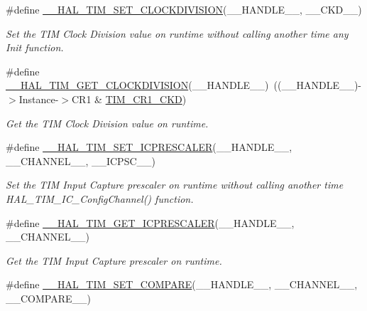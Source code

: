 \begin{DoxyCompactItemize}
\#define \mbox{\hyperlink{group___t_i_m___exported___macros_ga8aa84d77c670890408092630f9b2bdc4}{\+\_\+\+\_\+\+H\+A\+L\+\_\+\+T\+I\+M\+\_\+\+S\+E\+T\+\_\+\+C\+L\+O\+C\+K\+D\+I\+V\+I\+S\+I\+ON}}(\+\_\+\+\_\+\+H\+A\+N\+D\+L\+E\+\_\+\+\_\+,  \+\_\+\+\_\+\+C\+K\+D\+\_\+\+\_\+)
\begin{DoxyCompactList}\small\item\em Set the T\+IM Clock Division value on runtime without calling another time any Init function. \end{DoxyCompactList}\item 
\#define \mbox{\hyperlink{group___t_i_m___exported___macros_gae6bc91bb5940bce52828c690f24001b8}{\+\_\+\+\_\+\+H\+A\+L\+\_\+\+T\+I\+M\+\_\+\+G\+E\+T\+\_\+\+C\+L\+O\+C\+K\+D\+I\+V\+I\+S\+I\+ON}}(\+\_\+\+\_\+\+H\+A\+N\+D\+L\+E\+\_\+\+\_\+)~((\+\_\+\+\_\+\+H\+A\+N\+D\+L\+E\+\_\+\+\_\+)-\/$>$Instance-\/$>$C\+R1 \& \mbox{\hyperlink{group___peripheral___registers___bits___definition_gacacc4ff7e5b75fd2e4e6b672ccd33a72}{T\+I\+M\+\_\+\+C\+R1\+\_\+\+C\+KD}})
\begin{DoxyCompactList}\small\item\em Get the T\+IM Clock Division value on runtime. \end{DoxyCompactList}\item 
\#define \mbox{\hyperlink{group___t_i_m___exported___macros_gaeb106399b95ef02cec502f58276a0e92}{\+\_\+\+\_\+\+H\+A\+L\+\_\+\+T\+I\+M\+\_\+\+S\+E\+T\+\_\+\+I\+C\+P\+R\+E\+S\+C\+A\+L\+ER}}(\+\_\+\+\_\+\+H\+A\+N\+D\+L\+E\+\_\+\+\_\+,  \+\_\+\+\_\+\+C\+H\+A\+N\+N\+E\+L\+\_\+\+\_\+,  \+\_\+\+\_\+\+I\+C\+P\+S\+C\+\_\+\+\_\+)
\begin{DoxyCompactList}\small\item\em Set the T\+IM Input Capture prescaler on runtime without calling another time H\+A\+L\+\_\+\+T\+I\+M\+\_\+\+I\+C\+\_\+\+Config\+Channel() function. \end{DoxyCompactList}\item 
\#define \mbox{\hyperlink{group___t_i_m___exported___macros_gabfeec6b3c67a5747c7dbd20aff61d8e2}{\+\_\+\+\_\+\+H\+A\+L\+\_\+\+T\+I\+M\+\_\+\+G\+E\+T\+\_\+\+I\+C\+P\+R\+E\+S\+C\+A\+L\+ER}}(\+\_\+\+\_\+\+H\+A\+N\+D\+L\+E\+\_\+\+\_\+,  \+\_\+\+\_\+\+C\+H\+A\+N\+N\+E\+L\+\_\+\+\_\+)
\begin{DoxyCompactList}\small\item\em Get the T\+IM Input Capture prescaler on runtime. \end{DoxyCompactList}\item 
\#define \mbox{\hyperlink{group___t_i_m___exported___macros_ga300d0c9624c3b072d3afeb7cef639b66}{\+\_\+\+\_\+\+H\+A\+L\+\_\+\+T\+I\+M\+\_\+\+S\+E\+T\+\_\+\+C\+O\+M\+P\+A\+RE}}(\+\_\+\+\_\+\+H\+A\+N\+D\+L\+E\+\_\+\+\_\+,  \+\_\+\+\_\+\+C\+H\+A\+N\+N\+E\+L\+\_\+\+\_\+,  \+\_\+\+\_\+\+C\+O\+M\+P\+A\+R\+E\+\_\+\+\_\+)

\end{DoxyCompactItemize}
